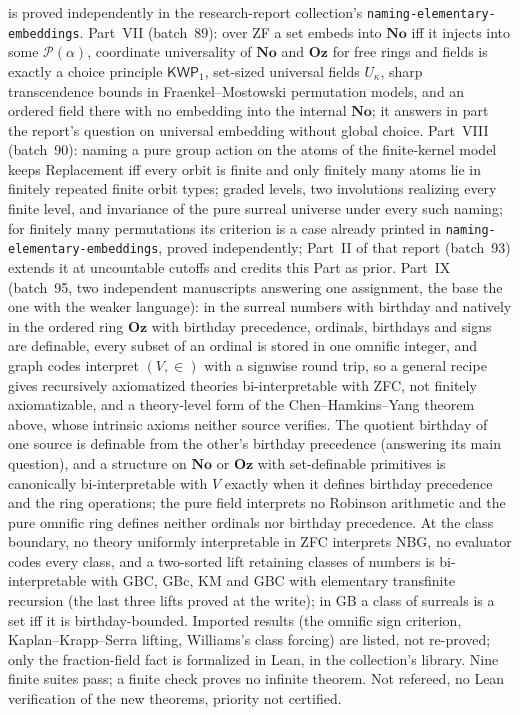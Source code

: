 \documentclass[11pt]{article}
\newcommand{\No}{\mathbf{No}}
\newcommand{\Oz}{\mathbf{Oz}}
\begin{document}
{is proved independently in the research-report collection's
\nolinkurl{naming-elementary-embeddings}.  Part~VII (batch~89): over ZF a
set embeds into $\No$ iff it injects into some $\mathcal P(\alpha)$,
coordinate universality of $\No$ and $\Oz$ for free rings and fields is
exactly a choice principle $\mathsf{KWP}_1$, set-sized universal fields
$U_\kappa$, sharp transcendence bounds in Fraenkel--Mostowski permutation
models, and an ordered field there with no embedding into the internal
$\No$; it answers in part the report's question on universal embedding
without global choice.  Part~VIII (batch~90): naming a pure group action on
the atoms of the finite-kernel model keeps Replacement iff every orbit is
finite and only finitely many atoms lie in finitely repeated finite orbit
types; graded levels, two involutions realizing every finite level, and
invariance of the pure surreal universe under every such naming; for
finitely many permutations its criterion is a case already printed in
\nolinkurl{naming-elementary-embeddings}, proved independently; Part~II of
that report (batch~93) extends it at uncountable cutoffs and credits this
Part as prior.  Part~IX (batch~95, two independent manuscripts answering one
assignment, the base the one with the weaker language): in the surreal
numbers with birthday and natively in the ordered ring $\Oz$ with birthday
precedence, ordinals, birthdays and signs are definable, every subset of an
ordinal is stored in one omnific integer, and graph codes interpret
$(V,\in)$ with a signwise round trip, so a general recipe gives recursively axiomatized
theories bi-interpretable with ZFC, not finitely axiomatizable, and a
theory-level form of the Chen--Hamkins--Yang theorem above, whose intrinsic
axioms neither source verifies.  The quotient birthday of one source is
definable from the other's birthday precedence (answering its main
question), and a structure on $\No$ or $\Oz$ with set-definable primitives is canonically
bi-interpretable with $V$ exactly when it defines birthday precedence and
the ring operations; the pure field interprets no Robinson arithmetic and
the pure omnific ring defines neither ordinals nor birthday precedence.  At
the class boundary, no theory uniformly interpretable in ZFC interprets
NBG, no evaluator codes every class, and a two-sorted lift retaining
classes of numbers is bi-interpretable with GBC, GBc, KM and GBC with
elementary transfinite recursion (the last three lifts proved at the
write); in GB a class of surreals is a set iff it is birthday-bounded.
Imported results (the omnific sign criterion, Kaplan--Krapp--Serra lifting,
Williams's class forcing) are listed, not re-proved; only the fraction-field
fact is formalized in Lean, in the collection's library.  Nine
finite suites pass; a finite check proves no infinite theorem.  Not
refereed, no Lean verification of the new theorems, priority not certified.}
\end{document}
